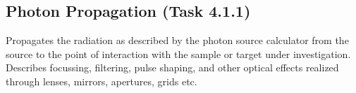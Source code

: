 \documentclass[12pt]{scrartcl}
\begin{document}
%
\subsection{Photon Propagation (Task 4.1.1)}
Propagates the radiation as described by the photon source calculator from the
source to the point of interaction with the sample or target under
investigation. Describes focussing, filtering, pulse shaping, and other optical
effects realized through lenses, mirrors, apertures, grids etc.
\end{document}
